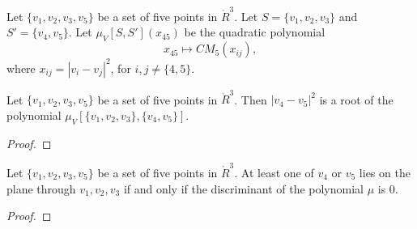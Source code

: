 \begin{tarskidata}
\begin{tarski}

\begin{definition}[$\mu_V$]
Let $\{v_1,v_2,v_3,v_5\}$ be a set of five
points in $\ring{R}^3$.   Let $S=\{v_1,v_2,v_3\}$ and $S'=\{v_4,v_5\}$.
Let $\mu_V[S,S'](x_{45})$ be the quadratic polynomial 
   $$x_{45}\mapsto CM_5(x_{ij}),$$
where $x_{ij} = |v_i-v_j|^2$, for ${i,j}\ne \{4,5\}$.  
\end{definition}
\end{tarski}



\begin{tarski}

\begin{lemma}  
Let $\{v_1,v_2,v_3,v_5\}$ be a set of five
points in $\ring{R}^3$.  
Then $|v_4-v_5|^2$ is a root of the polynomial 
$\mu_V[\{v_1,v_2,v_3\},\{v_4,v_5\}]$. 
\end{lemma}

\begin{proof}
\end{proof}
\end{tarski}




\begin{tarski}

\begin{lemma}
Let $\{v_1,v_2,v_3,v_5\}$ be a set of five
points in $\ring{R}^3$.  
At least one of $v_4$ or $v_5$ lies on the plane through $v_1,v_2,v_3$ if and only if
the discriminant of the polynomial $\mu$ is $0$.
\end{lemma}

\begin{proof}
\end{proof}
\end{tarski}




\end{tarskidata}
